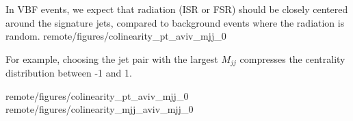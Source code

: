 {
    { \scriptsize
        In VBF events, we expect that radiation (ISR or FSR) should be closely centered around the signature jets, compared to background events where the radiation is random.
    }
}{remote/figures/colinearity_pt_aviv_mjj_0}

{
    For example, choosing the jet pair with the largest $M_{jj}$ compresses the centrality distribution between -1 and 1.
    
}
{remote/figures/colinearity_pt_aviv_mjj_0}
{remote/figures/colinearity_mjj_aviv_mjj_0}


